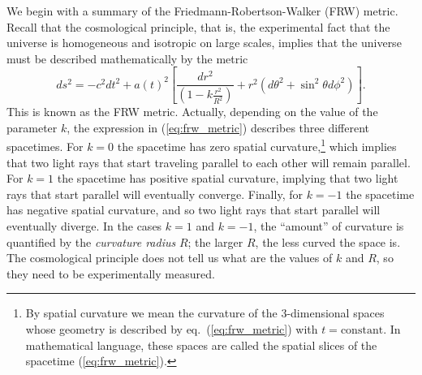 We begin with a summary of the Friedmann-Robertson-Walker (FRW) metric. Recall that the cosmological principle, that is, the experimental fact that the universe is homogeneous and isotropic on large scales, implies that the universe must be described mathematically by the metric
\begin{equation} \label{eq:frw_metric}
ds^2=-c^2dt^2+a(t)^2\left[\frac{dr^2}{\left(1-k\frac{r^2}{R^2}\right)}+r^2\left(d\theta^2+\sin^2\theta d\phi^2\right)\right].
\end{equation}
This is known as the FRW metric. Actually, depending on the value of the parameter $k$, the expression in (\ref{eq:frw_metric}) describes three different spacetimes. For $k=0$ the spacetime has zero spatial curvature,\footnote{By spatial curvature we mean the curvature of the 3-dimensional spaces whose geometry is described by eq.\ (\ref{eq:frw_metric}) with $t=\mathrm{constant}$. In mathematical language, these spaces are called the spatial slices of the spacetime (\ref{eq:frw_metric}).} which implies that two light rays that start traveling parallel to each other will remain parallel. For $k=1$ the spacetime has positive spatial curvature, implying that two light rays that start parallel will eventually converge. Finally, for $k=-1$ the spacetime has negative spatial curvature, and so two light rays that start parallel will eventually diverge. In the cases $k=1$ and $k=-1$, the ``amount'' of curvature is quantified by the {\it curvature radius} $R$; the larger $R$, the less curved the space is. The 
cosmological principle does not tell us what are the values of $k$ and $R$, so they need to be experimentally measured.

